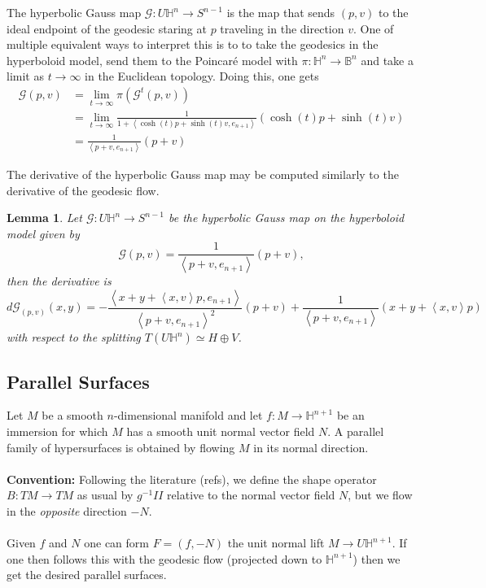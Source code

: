 \documentclass{amsart}
\newcommand{\two}{I\!\!I}
\newtheorem{lem}[thm]{Lemma}
\renewcommand{\H}{\mathbb{H}}
\begin{document}
The hyperbolic Gauss map $\mathcal{G}:U\H^n \to S^{n-1}$ is the map that sends $(p,v)$ to the ideal endpoint of the geodesic staring at $p$ traveling in the direction $v$. 
One of multiple equivalent ways to interpret this is to to take the geodesics in the hyperboloid model, send them to the Poincar\'e model with $\pi:\H^n \to \mathbb{B}^n$ and take a limit as $t\to \infty$ in the Euclidean topology. 
Doing this, one gets 
\begin{align*}
\mathcal{G}(p,v) 
&= \lim_{t\to\infty} \pi(\mathcal{G}^t(p,v)) \\
&= \lim_{t \to \infty} \frac{1}{1 + \left< \cosh(t)p+\sinh(t)v,e_{n+1}\right>} (\cosh(t)p + \sinh(t)v) \\
&= \frac{1}{\left<p+v,e_{n+1}\right>} (p+v)
\end{align*} 

The derivative of the hyperbolic Gauss map may be computed similarly to the derivative of the geodesic flow. 

\begin{lem}
Let $\mathcal{G}:U\H^n \to S^{n-1}$ be the hyperbolic Gauss map on the hyperboloid model given by 
\[
\mathcal{G}(p,v) = \frac{1}{\left<p+v,e_{n+1}\right>}(p+v),
\]
then the derivative is 
\[
d\mathcal{G}_{(p,v)}(x,y)
=-\frac{\left< x + y + \left<x,v\right>p, e_{n+1} \right>}{\left< p + v, e_{n+1} \right>^2}(p+v) + \frac{1}{\left< p + v, e_{n+1} \right>}(x + y + \left<x,v\right>p)
\]
with respect to the splitting $T(U\H^n) \simeq H \oplus V$.
\end{lem}

\subsection{Parallel Surfaces}

Let $M$ be a smooth $n$-dimensional manifold and let $f: M \to \H^{n+1}$ be an immersion for which $M$ has a smooth unit normal vector field $N$.
A parallel family of hypersurfaces is obtained by flowing $M$ in its normal direction. 
\\
\\
\noindent
{\bf Convention:} Following the literature (refs), we define the shape operator $B: TM \to TM$ as usual by $g^{-1}\two$ relative to the normal vector field $N$, but we flow in the \emph{opposite} direction $-N$. 
\\
\\
Given $f$ and $N$ one can form $F = (f ,-N)$ the unit normal lift $M \to U\H^{n+1}$.
If one then follows this with the geodesic flow (projected down to $\H^{n+1}$) then we get the desired parallel surfaces.
\end{document}
